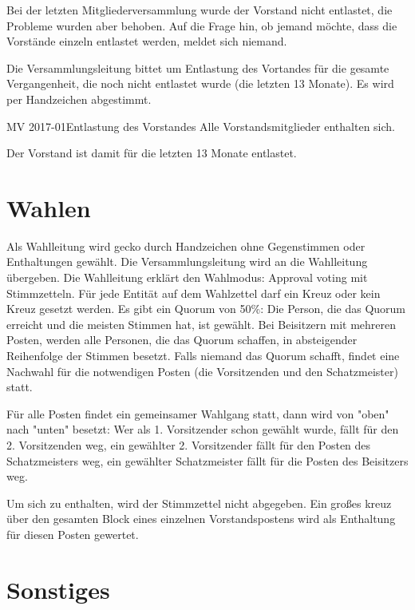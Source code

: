 \documentclass{s0minutes}
\begin{document}
Bei der letzten Mitgliederversammlung wurde der Vorstand nicht entlastet, die Probleme wurden aber behoben. Auf die Frage hin, ob jemand möchte, dass die Vorstände einzeln entlastet werden, meldet sich niemand.

Die Versammlungsleitung bittet um Entlastung des Vortandes für die gesamte Vergangenheit, die noch nicht entlastet wurde (die letzten 13 Monate). Es wird per Handzeichen abgestimmt.

\begin{resolution}{MV 2017-01}{}{Entlastung des
  Vorstandes}{}
  Alle Vorstandsmitglieder enthalten sich.
\end{resolution}

Der Vorstand ist damit für die letzten 13 Monate entlastet.

\section{Wahlen}

Als Wahlleitung wird gecko durch Handzeichen ohne Gegenstimmen oder
Enthaltungen gewählt. Die Versammlungsleitung wird an die Wahlleitung übergeben.
Die Wahlleitung erklärt den Wahlmodus: Approval voting mit Stimmzetteln. Für jede Entität auf dem Wahlzettel darf ein Kreuz oder kein Kreuz gesetzt werden.
Es gibt ein Quorum von 50\%: Die Person, die das Quorum erreicht und die meisten Stimmen hat, ist gewählt.
Bei Beisitzern mit mehreren Posten, werden alle Personen, die das Quorum schaffen, in absteigender Reihenfolge der Stimmen besetzt.
Falls niemand das Quorum schafft, findet eine Nachwahl für die notwendigen Posten (die Vorsitzenden und den Schatzmeister) statt.

Für alle Posten findet ein gemeinsamer Wahlgang statt, dann wird von "oben" nach "unten" besetzt: Wer als 1. Vorsitzender schon gewählt wurde, fällt für den 2. Vorsitzenden weg, ein gewählter 2. Vorsitzender fällt für den Posten des Schatzmeisters weg, ein gewählter Schatzmeister fällt für die Posten des Beisitzers weg.

Um sich zu enthalten, wird der Stimmzettel nicht abgegeben. Ein großes kreuz über den gesamten Block eines einzelnen Vorstandspostens wird als Enthaltung für diesen Posten gewertet.

\section{Sonstiges}

\end{document}
